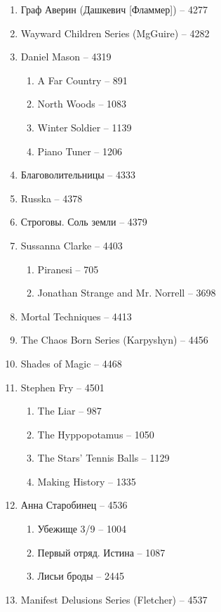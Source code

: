 \documentclass[a4paper, 11pt]{proc} %
\begin{document}
\begin{enumerate}
    \item Граф Аверин (Дашкевич [Фламмер]) -- 4277
    \item Wayward Children Series (MgGuire) -- 4282
    \item Daniel Mason -- 4319
        \begin{enumerate}
            \item A Far Country -- 891
            \item North Woods -- 1083
            \item Winter Soldier -- 1139
            \item Piano Tuner -- 1206
        \end{enumerate}
    \item Благоволительницы -- 4333
    \item Russka -- 4378
    \item Строговы. Соль земли -- 4379
    \item Sussanna Clarke -- 4403
        \begin{enumerate}
            \item Piranesi -- 705
            \item Jonathan Strange and Mr. Norrell -- 3698
        \end{enumerate}
    \item Mortal Techniques -- 4413
    \item The Chaos Born Series (Karpyshyn) -- 4456
    \item Shades of Magic -- 4468
    \item Stephen Fry -- 4501
        \begin{enumerate}
            \item The Liar -- 987
            \item The Hyppopotamus -- 1050
            \item The Stars' Tennis Balls -- 1129
            \item Making History -- 1335
        \end{enumerate}
    \item Анна Старобинец -- 4536
        \begin{enumerate}
            \item Убежище 3/9 -- 1004
            \item Первый отряд. Истина -- 1087
            \item Лисьи броды -- 2445
        \end{enumerate}
    \item Manifest Delusions Series (Fletcher) -- 4537

\end{enumerate}
\end{document}
